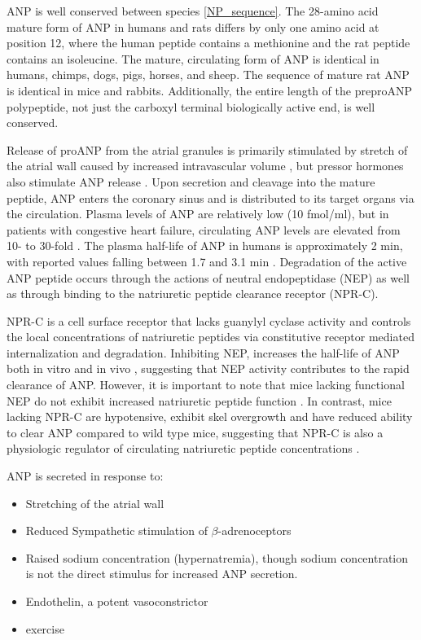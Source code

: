 \documentclass[14pt,a4paper,onecolumn]{extarticle}
\begin{document}
ANP is well conserved between species \ref{NP_sequence}. The 28-amino acid mature form of ANP in humans and rats differs by only one amino acid at position 12, where the human peptide contains a methionine and the rat peptide contains an isoleucine. The mature, circulating form of ANP is identical in humans, chimps, dogs, pigs, horses, and sheep. The sequence of mature rat ANP is identical in mice and rabbits. Additionally, the entire length of the preproANP polypeptide, not just the carboxyl terminal biologically active end, is well conserved.

Release of proANP from the atrial granules is primarily stimulated by stretch of the atrial wall caused by increased intravascular volume \citep{Bilder1986} \citep{Edwards1988} \citep{Lang1985}, but pressor hormones also stimulate ANP release \citep{Ruskoaho2003}.
Upon secretion and cleavage into the mature peptide, ANP enters the coronary sinus and is distributed to its target organs via the circulation. Plasma levels of ANP are relatively low (10 fmol/ml), but in patients with congestive heart failure, circulating ANP levels are elevated from 10- to 30-fold \citep{Burnett1986} \citep{Cody1986}.
The plasma half-life of ANP in humans is approximately 2 min, with reported values falling between 1.7 and 3.1 min \citep{Nakao1986} \citep{Yandle1986}.
Degradation of the active ANP peptide occurs through the actions of neutral endopeptidase (NEP) \citep{Stephenson1987} \citep{Vanneste1988} as well as through binding to the natriuretic peptide clearance receptor (NPR-C).

NPR-C is a cell surface receptor that lacks guanylyl cyclase activity and controls the local concentrations of natriuretic peptides via constitutive receptor mediated internalization and degradation. Inhibiting NEP, increases the half-life of ANP both in vitro \citep{Stephenson1987} \citep{Yandle1989} and in vivo \citep{Yandle1989},
suggesting that NEP activity contributes to the rapid clearance of ANP. However, it is important to note that mice lacking functional NEP do not exhibit increased natriuretic peptide function \citep{Lu1995}.
In contrast, mice lacking NPR-C are hypotensive, exhibit skel overgrowth and have reduced ability to clear ANP compared to wild type mice, suggesting that NPR-C is also a physiologic regulator of circulating natriuretic peptide concentrations \citep{Matsukawa1999}.

ANP is secreted in response to:
    \begin{itemize}
        \item Stretching of the atrial wall \citep{Widmaier2008}
        \item Reduced Sympathetic stimulation of $\beta$-adrenoceptors
        \item Raised sodium concentration (hypernatremia), though sodium concentration is not the direct stimulus for increased ANP secretion. \citep{Widmaier2008}
        \item Endothelin, a potent vasoconstrictor
        \item exercise \citep{Kokkonen2002}
    \end{itemize}
\end{document}
